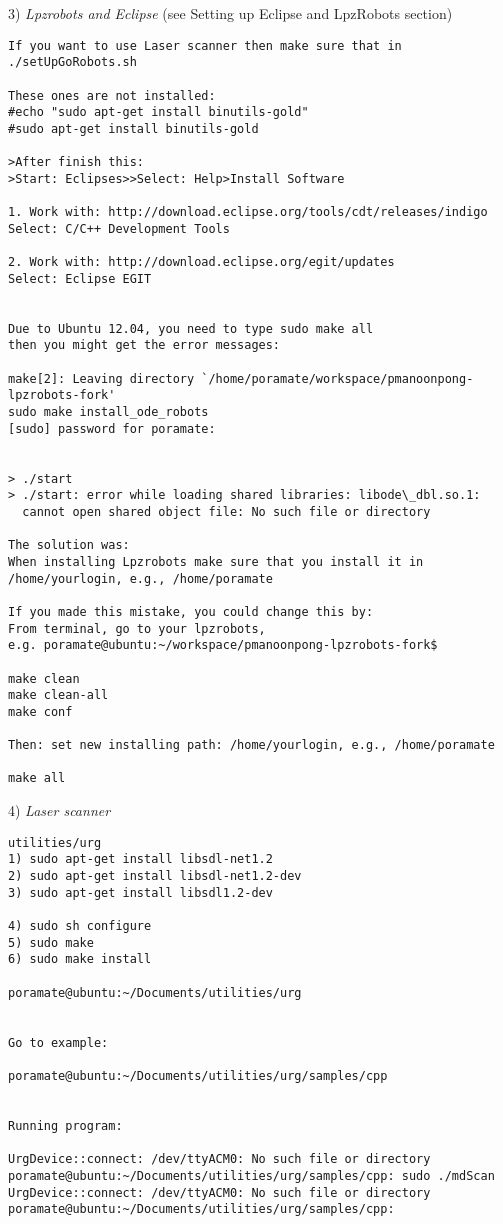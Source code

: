 3) \emph{Lpzrobots and Eclipse} (see Setting up Eclipse and LpzRobots section)
\begin{lstlisting}
If you want to use Laser scanner then make sure that in
./setUpGoRobots.sh

These ones are not installed:
#echo "sudo apt-get install binutils-gold"
#sudo apt-get install binutils-gold

>After finish this:
>Start: Eclipses>>Select: Help>Install Software

1. Work with: http://download.eclipse.org/tools/cdt/releases/indigo
Select: C/C++ Development Tools

2. Work with: http://download.eclipse.org/egit/updates
Select: Eclipse EGIT


Due to Ubuntu 12.04, you need to type sudo make all
then you might get the error messages:

make[2]: Leaving directory `/home/poramate/workspace/pmanoonpong-lpzrobots-fork'
sudo make install_ode_robots
[sudo] password for poramate:


> ./start
> ./start: error while loading shared libraries: libode\_dbl.so.1:
  cannot open shared object file: No such file or directory

The solution was:
When installing Lpzrobots make sure that you install it in
/home/yourlogin, e.g., /home/poramate

If you made this mistake, you could change this by:
From terminal, go to your lpzrobots,
e.g. poramate@ubuntu:~/workspace/pmanoonpong-lpzrobots-fork$

make clean
make clean-all
make conf

Then: set new installing path: /home/yourlogin, e.g., /home/poramate

make all

\end{lstlisting}

4) \emph{Laser scanner}

\begin{lstlisting}
utilities/urg
1) sudo apt-get install libsdl-net1.2
2) sudo apt-get install libsdl-net1.2-dev
3) sudo apt-get install libsdl1.2-dev

4) sudo sh configure
5) sudo make
6) sudo make install

poramate@ubuntu:~/Documents/utilities/urg


Go to example:

poramate@ubuntu:~/Documents/utilities/urg/samples/cpp


Running program:

UrgDevice::connect: /dev/ttyACM0: No such file or directory
poramate@ubuntu:~/Documents/utilities/urg/samples/cpp: sudo ./mdScan
UrgDevice::connect: /dev/ttyACM0: No such file or directory
poramate@ubuntu:~/Documents/utilities/urg/samples/cpp:

\end{lstlisting}


